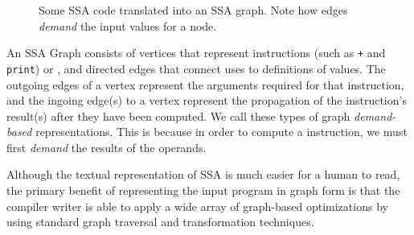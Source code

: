 \begin{figure}[ht]
\centering
{}

\caption{Some SSA code translated into an SSA graph. Note how edges \textit{demand} the input values for a node.}
\label{fig:ssa-graph-example-code}
\end{figure}

An SSA Graph consists of vertices that represent instructions (such as \texttt{+} and \texttt{print}) or \phifuns, and directed edges that connect uses to definitions of values. 
The outgoing edges of a vertex represent the arguments required for that instruction, and the ingoing edge(s) to a vertex represent the propagation of the instruction's result(s) after they have been computed. 
We call these types of graph \textit{demand-based} representations. 
This is because in order to compute a instruction, we must first \textit{demand} the results of the operands. 

Although the textual representation of SSA is much easier for a human to read, the primary benefit of representing the input program in graph form is that the compiler writer is able to apply a wide array of graph-based optimizations by using standard graph traversal and transformation techniques. 

